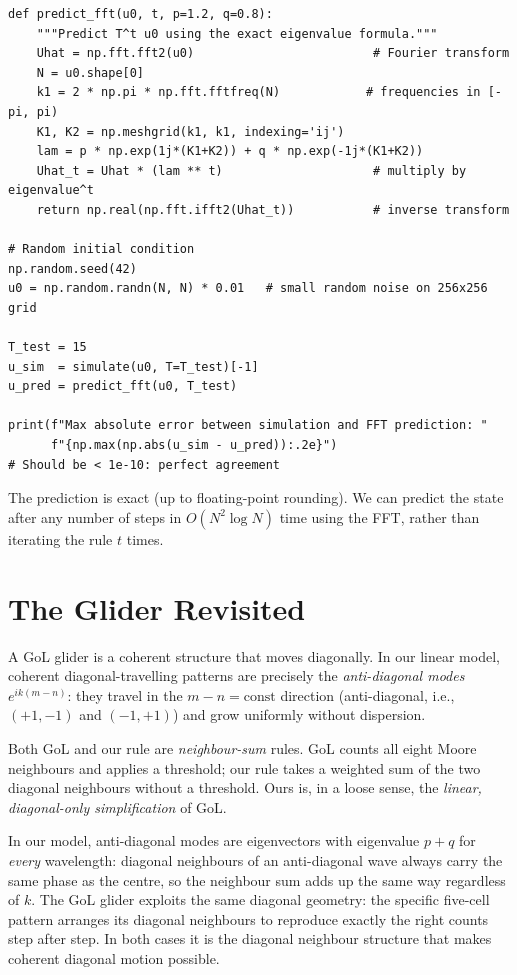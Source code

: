 \documentclass[11pt]{article}
\begin{document}
\begin{lstlisting}
def predict_fft(u0, t, p=1.2, q=0.8):
    """Predict T^t u0 using the exact eigenvalue formula."""
    Uhat = np.fft.fft2(u0)                         # Fourier transform
    N = u0.shape[0]
    k1 = 2 * np.pi * np.fft.fftfreq(N)            # frequencies in [-pi, pi)
    K1, K2 = np.meshgrid(k1, k1, indexing='ij')
    lam = p * np.exp(1j*(K1+K2)) + q * np.exp(-1j*(K1+K2))
    Uhat_t = Uhat * (lam ** t)                     # multiply by eigenvalue^t
    return np.real(np.fft.ifft2(Uhat_t))           # inverse transform

# Random initial condition
np.random.seed(42)
u0 = np.random.randn(N, N) * 0.01   # small random noise on 256x256 grid

T_test = 15
u_sim  = simulate(u0, T=T_test)[-1]
u_pred = predict_fft(u0, T_test)

print(f"Max absolute error between simulation and FFT prediction: "
      f"{np.max(np.abs(u_sim - u_pred)):.2e}")
# Should be < 1e-10: perfect agreement
\end{lstlisting}

\noindent
The prediction is exact (up to floating-point rounding).  We can
predict the state after any number of steps in $O(N^2 \log N)$ time
using the FFT, rather than iterating the rule $t$ times.


\section*{The Glider Revisited}

\noindent
A GoL glider is a coherent structure that moves diagonally.
In our linear model, coherent diagonal-travelling patterns are
precisely the \emph{anti-diagonal modes} $e^{ik(m-n)}$: they travel
in the $m-n = \text{const}$ direction (anti-diagonal, i.e.,
$(+1,-1)$ and $(-1,+1)$) and grow uniformly without dispersion.

\medskip\noindent
Both GoL and our rule are \emph{neighbour-sum} rules.
GoL counts all eight Moore neighbours and applies a threshold;
our rule takes a weighted sum of the two diagonal neighbours without a
threshold.
Ours is, in a loose sense, the \emph{linear, diagonal-only
simplification} of GoL.

\medskip\noindent
In our model, anti-diagonal modes are eigenvectors with eigenvalue
$p+q$ for \emph{every} wavelength: diagonal neighbours of an
anti-diagonal wave always carry the same phase as the centre, so
the neighbour sum adds up the same way regardless of $k$.
The GoL glider exploits the same diagonal geometry: the specific
five-cell pattern arranges its diagonal neighbours to reproduce
exactly the right counts step after step.
In both cases it is the diagonal neighbour structure that makes
coherent diagonal motion possible.
\end{document}
